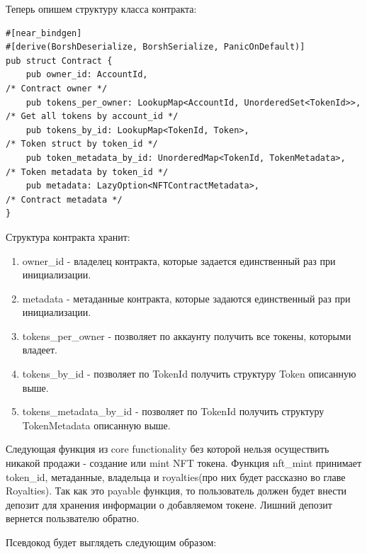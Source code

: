 Теперь опишем структуру класса контракта:
\begin{verbatim}
#[near_bindgen]
#[derive(BorshDeserialize, BorshSerialize, PanicOnDefault)]
pub struct Contract {
    pub owner_id: AccountId,                                                /* Contract owner */
    pub tokens_per_owner: LookupMap<AccountId, UnorderedSet<TokenId>>,      /* Get all tokens by account_id */
    pub tokens_by_id: LookupMap<TokenId, Token>,                            /* Token struct by token_id */
    pub token_metadata_by_id: UnorderedMap<TokenId, TokenMetadata>,         /* Token metadata by token_id */
    pub metadata: LazyOption<NFTContractMetadata>,                          /* Contract metadata */
}
\end{verbatim}

Структура контракта хранит:
\begin{enumerate}
\item owner\_id - владелец контракта, которые задается единственный раз при инициализации.
\item metadata - метаданные контракта, которые задаются единственный раз при инициализации.
\item tokens\_per\_owner - позволяет по аккаунту получить все токены, которыми владеет.
\item tokens\_by\_id - позволяет по TokenId получить структуру Token описанную выше.
\item tokens\_metadata\_by\_id - позволяет по TokenId получить структуру TokenMetadata описанную выше.
\end{enumerate}

Следующая функция из core functionality без которой нельзя осуществить никакой продажи - создание или mint NFT токена. Функция nft\_mint принимает token\_id, метаданные, владельца и royalties(про них будет рассказно во главе Royalties).
Так как это payable функция, то пользователь должен будет внести депозит для хранения информации о добавляемом токене. Лишний депозит вернется пользвателю обратно.

Псевдокод будет выглядеть следующим образом:

